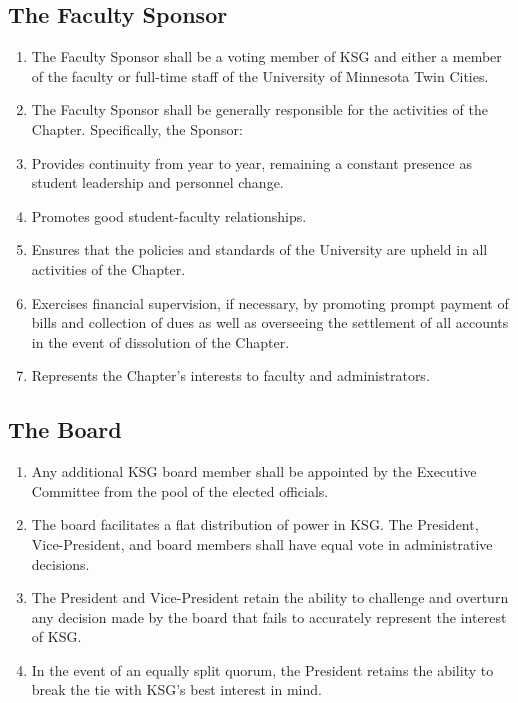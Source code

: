 \documentclass[12pt,letterpaper]{article}
\begin{document}
\subsection{The Faculty Sponsor}
\begin{enumerate}
  \item The Faculty Sponsor shall be a voting member of KSG and either a member of
        the faculty or full-time staff of the University of Minnesota Twin Cities.
  \item The Faculty Sponsor shall be generally responsible for the activities of the
        Chapter. Specifically, the Sponsor:
  \item Provides continuity from year to year, remaining a constant presence as
        student leadership and personnel change.
  \item Promotes good student-faculty relationships.
  \item Ensures that the policies and standards of the University are upheld in all
        activities of the Chapter.
  \item Exercises financial supervision, if necessary, by promoting prompt payment of
        bills and collection of dues as well as overseeing the settlement of all
        accounts in the event of dissolution of the Chapter.
  \item Represents the Chapter's interests to faculty and administrators.
\end{enumerate}

\subsection{The Board}
\begin{enumerate}
  \item Any additional KSG board member shall be appointed by the Executive Committee from
        the pool of the elected officials.
  \item The board facilitates a flat distribution of power in KSG. The President, Vice-President,
        and board members shall have equal vote in administrative decisions.
  \item The President and Vice-President retain the ability to challenge and overturn any
        decision made by the board that fails to accurately represent the interest of KSG.
  \item In the event of an equally split quorum, the President retains the ability to
        break the tie with KSG's best interest in mind.
\end{enumerate}
\end{document}
